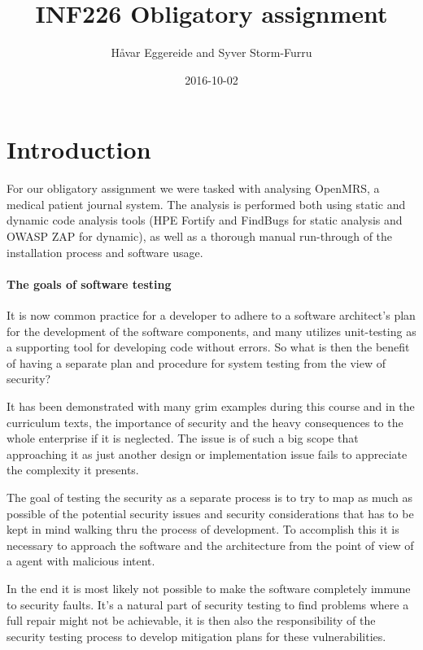 \documentclass{report} %
\title{INF226 Obligatory assignment}
\date{2016-10-02}
\author{Håvar Eggereide and Syver Storm-Furru}
\begin{document}
\maketitle
{}
\newpage
{}
\tableofcontents
\newpage
\section{Introduction}

  For our obligatory assignment we were tasked with analysing OpenMRS, a medical
  patient journal system. The analysis is performed both using static and
  dynamic code analysis tools (HPE Fortify and FindBugs for static analysis and
  OWASP ZAP for dynamic), as well as a thorough manual run-through of the installation
  process and software usage.

  \paragraph{The goals of software testing}

  It is now common practice  for a developer to adhere to a software architect's
  plan for the development of the software components, and many utilizes
  unit-testing as a supporting tool for developing code without errors. So what
  is then the benefit of having a separate plan and procedure for system testing
  from the view of security?

  It has been demonstrated with many grim examples during this course and in the
  curriculum texts, the importance of security and the heavy consequences to the
  whole enterprise if it is neglected. The issue is of such a big scope that
  approaching it as just another design or implementation issue fails to
  appreciate the complexity it presents.

  The goal of testing the security as a separate process is to try to map as
  much as possible of the potential security issues and security considerations
  that has to be kept in mind walking thru the process of development. To
  accomplish this it is necessary to approach the software and the architecture
  from the point of view of a agent with malicious intent.

  In the end it is  most likely not possible to make the software completely
  immune to security faults. It's a natural part of security testing to find
  problems where a full repair might not be achievable, it is then also the
  responsibility of the security testing process to develop mitigation plans for
  these vulnerabilities.
\end{document}
